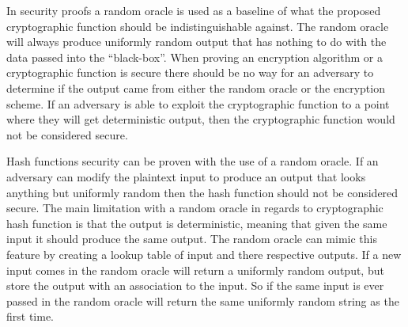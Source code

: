 \documentclass[letterpaper,11pt,notitlepage,fleqn]{article}
\begin{document}
In security proofs a random oracle is used as a baseline of what the proposed cryptographic function should be indistinguishable against. The random oracle will always produce uniformly random output that has nothing to do with the data passed into the ``black-box''. When proving an encryption algorithm or a cryptographic function is secure there should be no way for an adversary to determine if the output came from either the random oracle or the encryption scheme. If an adversary is able
to exploit the cryptographic function to a point where they will get deterministic output, then the cryptographic function would not be considered secure. \

Hash functions security can be proven with the use of a random oracle. If an adversary can modify the plaintext input to produce an output that looks anything but uniformly random then the hash function should not be considered secure. The main limitation with a random oracle in regards to cryptographic hash function is that the output is deterministic, meaning that given the same input it should produce the same output. The random oracle can mimic this feature by creating a lookup
table of input and there respective outputs. If a new input comes in the random oracle will return a uniformly random output, but store the output with an association to the input. So if the same input is ever passed in the random oracle will return the same uniformly random string as the first time. 

\medskip


\end{document}
